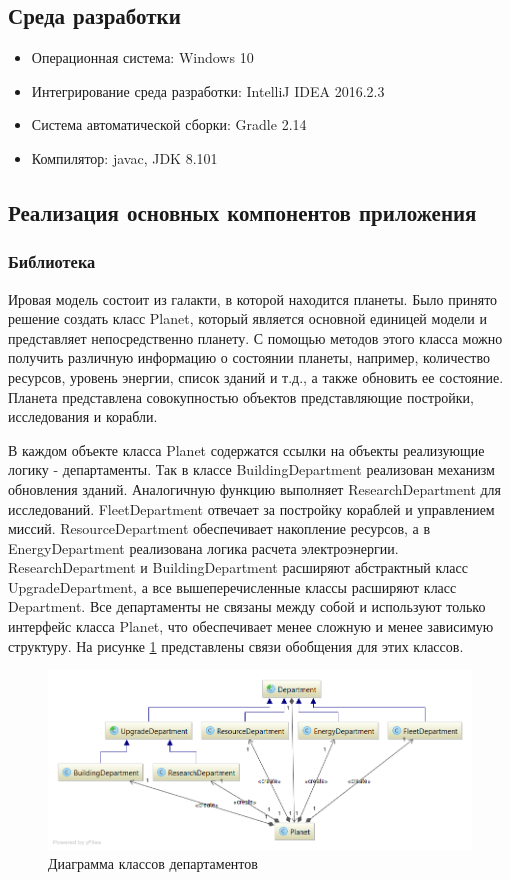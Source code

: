 \subsection{Среда разработки}

\begin{itemize}
	\item Операционная система: Windows 10
	\item Интегрирование среда разработки: IntelliJ IDEA 2016.2.3
	\item Система автоматической сборки: Gradle 2.14
	\item Компилятор: javac, JDK 8.101
\end{itemize}

\subsection{Реализация основных компонентов приложения}

\subsubsection{Библиотека}

Ировая модель состоит из галакти, в которой находится планеты. Было принято решение создать класс Planet, который является основной единицей модели и представляет непосредственно планету. С помощью методов этого класса можно получить различную информацию о состоянии планеты, например, количество ресурсов, уровень энергии, список зданий и т.д., а также обновить ее состояние. Планета представлена совокупностью объектов представляющие постройки, исследования и корабли.

В каждом объекте класса Planet содержатся ссылки на объекты реализующие логику - департаменты. Так в классе BuildingDepartment реализован механизм обновления зданий. Аналогичную функцию выполняет ResearchDepartment для исследований. FleetDepartment отвечает за постройку кораблей и управлением миссий. ResourceDepartment обеспечивает накопление ресурсов, а в EnergyDepartment  реализована логика расчета электроэнергии. ResearchDepartment и BuildingDepartment расширяют абстрактный класс UpgradeDepartment, а все вышеперечисленные классы расширяют класс Department. Все департаменты не связаны между собой и используют только интерфейс класса Planet, что обеспечивает менее сложную и менее зависимую структуру. На рисунке \ref{pic:d1} представлены связи обобщения для этих классов.

\begin{figure}[H]
\centering
\includegraphics[scale=0.5]{diagram2.png}
\caption{Диаграмма классов  департаментов}
\label{pic:d1}
\end{figure}

